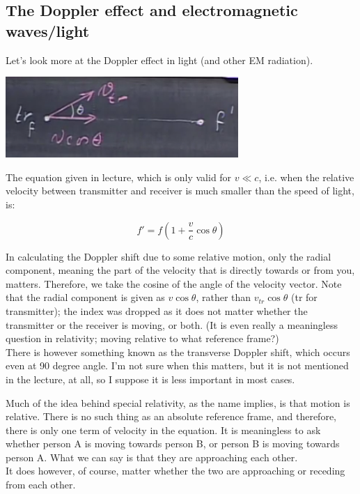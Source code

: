 \documentclass[8.01x]{subfiles}
\begin{document}
\subsection{The Doppler effect and electromagnetic waves/light}

Let's look more at the Doppler effect in light (and other EM radiation).

\begin{center}
\includegraphics[scale=0.6]{Graphics/lec23_doppler_em}
\end{center}

The equation given in lecture, which is only valid for $v \ll c$, i.e. when the relative velocity between transmitter and receiver is much smaller than the speed of light, is:

\begin{equation}
f' = f (1 + \frac{v}{c} \cos \theta)
\end{equation}

In calculating the Doppler shift due to some relative motion, only the radial component, meaning the part of the velocity that is directly towards or from you, matters. Therefore, we take the cosine of the angle of the velocity vector. Note that the radial component is given as $v \cos \theta$, rather than $v_{tr} \cos \theta$ (tr for transmitter); the index was dropped as it does not matter whether the transmitter or the receiver is moving, or both. (It is even really a meaningless question in relativity; moving relative to what reference frame?)\\
There is however something known as the transverse Doppler shift, which occurs even at 90 degree angle. I'm not sure when this matters, but it is not mentioned in the lecture, at all, so I suppose it is less important in most cases.

Much of the idea behind special relativity, as the name implies, is that motion is relative. There is no such thing as an absolute reference frame, and therefore, there is only one term of velocity in the equation. It is meaningless to ask whether person A is moving towards person B, or person B is moving towards person A. What we can say is that they are approaching each other.\\
It does however, of course, matter whether the two are approaching or receding from each other.
\end{document}
